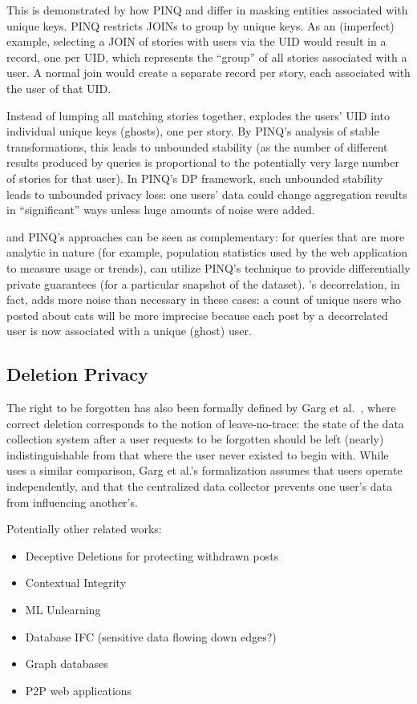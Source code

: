 This is demonstrated by how PINQ and \sys{} differ in masking entities associated with unique keys.
PINQ restricts JOINs to group by unique keys. As an (imperfect) example, selecting a JOIN of stories
with users via the UID would result in a record, one per UID, which represents the ``group'' of all
stories associated with a user. A normal join would create a separate record per story, each
associated with the user of that UID.

Instead of lumping all matching stories together, \sys{} explodes the users' UID into individual
unique keys (ghosts), one per story. By PINQ's analysis of stable transformations, this leads to
unbounded stability (as the number of different results produced by queries is proportional to the
potentially very large number of stories for that user). In PINQ's DP framework, such unbounded
stability leads to unbounded privacy loss: one users' data could change aggregation results in
``significant'' ways unless huge amounts of noise were added. 

\sys{} and PINQ's approaches can be seen as complementary: for queries that are more analytic in nature (for example,
population statistics used by the web application to measure usage or trends), \sys{} can utilize
PINQ's technique to provide differentially private guarantees (for a particular snapshot of the
dataset).  \sys{}'s decorrelation, in fact, adds more noise than necessary in these cases: a count
of unique users who posted about cats will be more imprecise because each post by a decorrelated
user is now associated with a unique (ghost) user.

\subsection{Deletion Privacy}
The right to be forgotten has also been formally defined by Garg et
al.~\cite{garg}, where correct deletion corresponds to the notion of
leave-no-trace: the state of the data collection system after a user requests to be forgotten should
be left (nearly) indistinguishable from that where the user never existed to begin with. While
\sys{} uses a similar comparison, Garg et al.'s formalization assumes that users operate
independently, and that the centralized data collector prevents one user's data from influencing
another's.

Potentially other related works:
\begin{itemize}
    \item Deceptive Deletions for protecting withdrawn posts %
    \item Contextual Integrity
    \item ML Unlearning
    \item Database IFC (sensitive data flowing down edges?)
    \item Graph databases
    \item P2P web applications
\end{itemize}
